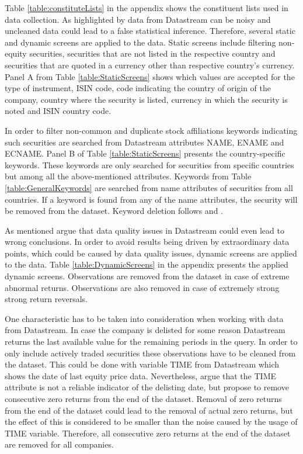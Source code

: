 \documentclass[12pt]{article}
\begin{document}
Table \ref{table:constituteLists} in the appendix shows the constituent lists used in data collection. As highlighted by \citet{Ince2006} data from Datastream can be noisy and uncleaned data could lead to a false statistical inference. Therefore, several static and dynamic screens are applied to the data. Static screens include filtering non-equity securities, securities that are not listed in the respective country and securities that are quoted in a currency other than respective country's currency. Panel A from Table \ref{table:StaticScreens} shows which values are accepted for the type of instrument, ISIN code, code indicating the country of origin of the company, country where the security is listed, currency in which the security is noted and ISIN country code. \par

In order to filter non-common and duplicate stock affiliations keywords indicating such securities are searched from Datastream attributes NAME, ENAME and ECNAME. Panel B of Table \ref{table:StaticScreens} presents the country-specific keywords. These keywords are only searched for securities from specific countries but among all the above-mentioned attributes. Keywords from Table \ref{table:GeneralKeywords} are searched from name attributes of securities from all countries. If a keyword is found from any of the name attributes, the security will be removed from the dataset. Keyword deletion follows \citet{Ince2006} and \citet{HANAUER2023106712}. \par

As mentioned \citet{Ince2006} argue that data quality issues in Datastream could even lead to wrong conclusions. In order to avoid results being driven by extraordinary data points, which could be caused by data quality issues, dynamic screens are applied to the data. Table \ref{table:DynamicScreens} in the appendix presents the applied dynamic screens. Observations are removed from the dataset in case of extreme abnormal returns. Observations are also removed in case of extremely strong strong return reversals.\par

One characteristic has to be taken into consideration when working with data from Datastream. In case the company is delisted for some reason Datastream returns the last available value for the remaining periods in the query. In order to only include actively traded securities these observations have to be cleaned from the dataset. This could be done with variable TIME from Datastream which shows the date of last equity price data. Nevertheless, \citet{Ince2006} argue that the TIME attribute is not a reliable indicator of the delisting date, but propose to remove consecutive zero returns from the end of the dataset. Removal of zero returns from the end of the dataset could lead to the removal of actual zero returns, but the effect of this is considered to be smaller than the noise caused by the usage of TIME variable. Therefore, all consecutive zero returns at the end of the dataset are removed for all companies. \par
\end{document}
